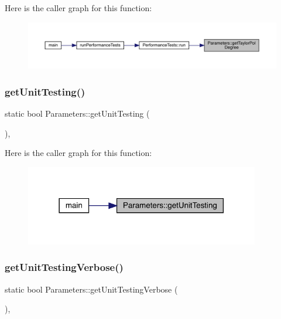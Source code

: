 Here is the caller graph for this function\+:\nopagebreak
\begin{figure}[H]
\begin{center}
\leavevmode
\includegraphics[width=350pt]{class_parameters_a272f8ebfbd305fb4a3b03db68417fc90_icgraph}
\end{center}
\end{figure}
\mbox{\label{class_parameters_a785042104e5f47f11d625ec346853174}} 
\subsubsection{\texorpdfstring{getUnitTesting()}{getUnitTesting()}}
{\footnotesize\ttfamily static bool Parameters\+::get\+Unit\+Testing (\begin{DoxyParamCaption}{ }\end{DoxyParamCaption})\hspace{0.3cm}{\ttfamily [inline]}, {\ttfamily [static]}}

Here is the caller graph for this function\+:\nopagebreak
\begin{figure}[H]
\begin{center}
\leavevmode
\includegraphics[width=290pt]{class_parameters_a785042104e5f47f11d625ec346853174_icgraph}
\end{center}
\end{figure}
\mbox{\label{class_parameters_a2645617063e170828a3da439094ab626}} 
\subsubsection{\texorpdfstring{getUnitTestingVerbose()}{getUnitTestingVerbose()}}
{\footnotesize\ttfamily static bool Parameters\+::get\+Unit\+Testing\+Verbose (\begin{DoxyParamCaption}{ }\end{DoxyParamCaption})\hspace{0.3cm}{\ttfamily [inline]}, {\ttfamily [static]}}

